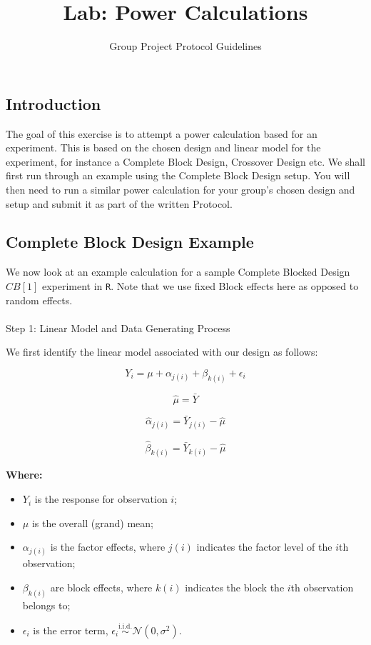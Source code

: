\documentclass[
  letterpaper,
  DIV=11,
  numbers=noendperiod]{scrartcl}
\title{Lab: Power Calculations}
\subtitle{Group Project Protocol Guidelines}
\author{}
\date{}
\makeatletter
\let\oldparagraph\paragraph
\renewcommand{\paragraph}{
    \@ifstar
      \xxxParagraphStar
      \xxxParagraphNoStar
  }
\newcommand{\xxxParagraphStar}[1]{\oldparagraph*{#1}\mbox{}}
\newcommand{\xxxParagraphNoStar}[1]{\oldparagraph{#1}\mbox{}}
\providecommand{\tightlist}{%
  \setlength{\itemsep}{0pt}\setlength{\parskip}{0pt}}
\makeatother
\begin{document}
\maketitle


\subsection{Introduction}\label{introduction}

The goal of this exercise is to attempt a power calculation based for an
experiment. This is based on the chosen design and linear model for the
experiment, for instance a Complete Block Design, Crossover Design etc.
We shall first run through an example using the Complete Block Design
setup. You will then need to run a similar power calculation for your
group's chosen design and setup and submit it as part of the written
Protocol.

\subsection{Complete Block Design
Example}\label{complete-block-design-example}

We now look at an example calculation for a sample Complete Blocked
Design \(CB[1]\) experiment in \texttt{R}. Note that we use fixed Block
effects here as opposed to random effects.

\paragraph{Step 1: Linear Model and Data Generating
Process}\label{step-1-linear-model-and-data-generating-process}

We first identify the linear model associated with our design as
follows:

\[
Y_i = \mu + \alpha_{j(i)} + \beta_{k(i)} + \epsilon_i
\]

\[
\hat{\mu} = \bar{Y}
\]

\[
\hat{\alpha}_{j(i)} = \bar{Y}_{j(i)} - \hat{\mu}
\]

\[
\hat{\beta}_{k(i)} = \bar{Y}_{k(i)} - \hat{\mu}
\]

\textbf{Where:}

\begin{itemize}
\tightlist
\item
  \(Y_i\) is the response for observation \(i\);\\
\item
  \(\mu\) is the overall (grand) mean;
\item
  \(\alpha_{j(i)}\) is the factor effects, where \(j(i)\) indicates the
  factor level of the \(i\)th observation;
\item
  \(\beta_{k(i)}\) are block effects, where \(k(i)\) indicates the block
  the \(i\)th observation belongs to;\\
\item
  \(\epsilon_i\) is the error term,
  \(\epsilon_i \overset{\text{i.i.d.}}{\sim} \mathcal{N}(0, \sigma^2)\).
\end{itemize}
\end{document}
